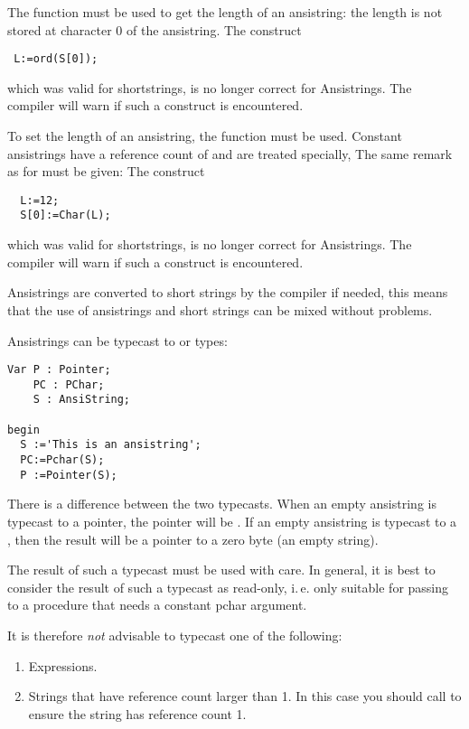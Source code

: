 The  function must be used to get the length of an
ansistring: the length is not stored at character 0 of the ansistring.
The construct
\begin{verbatim}
 L:=ord(S[0]);
\end{verbatim}
which was valid for \tp shortstrings, is no longer correct for
Ansistrings. The compiler will warn if such a construct is encountered.


To set the length of an ansistring, the  function must be used.
Constant ansistrings have a reference count of  and are treated specially,
The same remark as for  must be given: The construct
\begin{verbatim}
  L:=12;
  S[0]:=Char(L);
\end{verbatim}
which was valid for \tp shortstrings, is no longer correct for
Ansistrings. The compiler will warn if such a construct is encountered.

Ansistrings are converted to short strings by the compiler if needed,
this means that the use of ansistrings and short strings can be mixed
without problems.

Ansistrings can be typecast to  or  types:
\begin{verbatim}
Var P : Pointer;
    PC : PChar;
    S : AnsiString;

begin
  S :='This is an ansistring';
  PC:=Pchar(S);
  P :=Pointer(S);
\end{verbatim}
There is a difference between the two typecasts. When an empty
ansistring is typecast to a pointer, the pointer will be . If an
empty ansistring is typecast to a , then the result will be a pointer to a
zero byte (an empty string).

The result of such a typecast must be used with care. In general, it is best
to consider the result of such a typecast as read-only, i.\,e. only suitable for
passing to a procedure that needs a constant pchar argument.

It is therefore {\em not} advisable to typecast one of the following:
\begin{enumerate}
\item Expressions.
\item Strings that have reference count larger than 1.
In this case you should call  to ensure the
string has reference count 1.
\end{enumerate}

